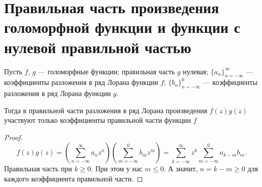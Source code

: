 \documentclass[../paper.tex]{subfiles}
\begin{document}
\section{Правильная часть произведения голоморфной функции и функции с нулевой правильной частью}
\begin{Th*}
Пусть $f$, $g$ --- голоморфные функции; правильная часть $g$ нулевая; 
$\{a_n\}_{n=-\infty}^\infty$ --- коэффициенты разложения в ряд Лорана функции $f$;
$\{b_n\}_{n=-\infty}^{0}$ --- коэффициенты разложения в ряд Лорана функции $g$.

Тогда в правильной части разложения в ряд Лорана произведения $f(z)g(z)$ участвуют только коэффициенты правильной части функции $f$
\end{Th*}
\begin{proof}
\[
    f(z)g(z) =
%
    \left(\sum_{n=-\infty}^{\infty} a_n z^n\right)
    \left(\sum_{m=-\infty}^{0} b_m z^m\right) =
%
    \sum_{k=-\infty}^{\infty} z^k \sum_{m=-\infty}^{0} a_{k-m} b_m
.\]
Правильная часть при $k \ge 0$. При этом у нас $m \le 0$. А значит, $n = k-m \ge 0$ для каждого коэффициента правильной части.
\end{proof}
\end{document}
